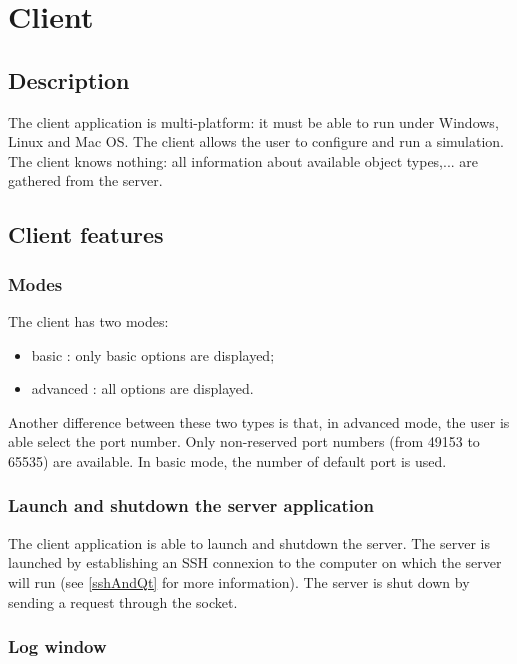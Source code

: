 \chapter{Client}

\section{Description}

The client application is multi-platform: it must be able to run under Windows,
Linux and Mac OS. The client allows the user to configure and run a simulation.
The client knows nothing: all information about available object types,... are
gathered from the server. 

\section{Client features}

\subsection{Modes}

The client has two modes:
\begin{itemize}
 \item basic : only basic options are displayed;
 \item advanced : all options are displayed.\\
\end{itemize}

Another difference between these two types is that, in advanced mode, the user
is able select the port number. Only non-reserved port numbers (from 49153 to
65535) are available. In basic mode, the number of default port is used.

\subsection{Launch and shutdown the server application}

The client application is able to launch and shutdown the server. The server is
launched by establishing an SSH connexion to the computer on which the server
will run (see \ref{sshAndQt} for more information). The server is shut down by
sending a request through the socket.\\

\subsection{Log window}


